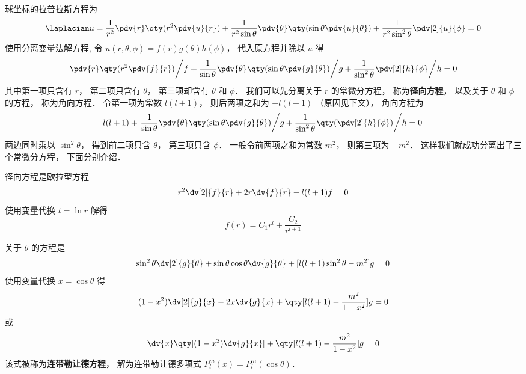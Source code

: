 

球坐标的拉普拉斯方程为
\begin{equation}
\laplacian u = \frac{1}{r^2} \pdv{r} \qty(r^2 \pdv{u}{r}) + \frac{1}{r^2 \sin\theta}\pdv{\theta} \qty(\sin \theta \pdv{u}{\theta}) + \frac{1}{r^2 \sin^2 \theta} \pdv[2]{u}{\phi} = 0
\end{equation}
使用分离变量法解方程, 令 $u(r, \theta, \phi) = f(r)g(\theta)h(\phi)$， 代入原方程并除以 $u$ 得
\begin{equation}
\left. \pdv{r} \qty(r^2 \pdv{f}{r}) \middle/ f + \frac{1}{\sin\theta}\pdv{\theta} \qty(\sin \theta \pdv{g}{\theta}) \middle/ g + \frac{1}{\sin^2 \theta} \pdv[2]{h}{\phi} \middle/ h = 0 \right.
\end{equation}
其中第一项只含有 $r$， 第二项只含有 $\theta$， 第三项却含有 $\theta$ 和 $\phi$． 我们可以先分离关于 $r$ 的常微分方程， 称为\textbf{径向方程}， 以及关于 $\theta$ 和 $\phi$ 的方程， 称为角向方程． 令第一项为常数 $l(l+1)$， 则后两项之和为 $-l(l+1)$ （原因见下文）， 角向方程为
\begin{equation}\label{SphLap_eq3}
l(l+1) + \left. \frac{1}{\sin\theta}\pdv{\theta} \qty(\sin \theta \pdv{g}{\theta}) \middle/ g + \frac{1}{\sin^2 \theta} \qty(\pdv[2]{h}{\phi}) \middle/ h = 0 \right.
\end{equation}
两边同时乘以 $\sin^2\theta$， 得到前二项只含 $\theta$， 第三项只含 $\phi$． 一般令前两项之和为常数 $m^2$， 则第三项为 $-m^2$． 这样我们就成功分离出了三个常微分方程， 下面分别介绍．

径向方程是欧拉型方程%
\begin{equation}
r^2\dv[2]{f}{r} + 2r\dv{f}{r} - l(l+1)f = 0
\end{equation}
使用变量代换 $t = \ln r$ 解得
\begin{equation}
f(r) = C_1 r^l + \frac{C_2}{r^{l+1}}
\end{equation}

关于 $\theta$ 的方程是
\begin{equation}
\sin^2\theta \dv[2]{g}{\theta} + \sin\theta\cos\theta\dv{g}{\theta} + [l(l+1)\sin^2\theta - m^2] g = 0
\end{equation}
使用变量代换 $x = \cos\theta$ 得
\begin{equation}
(1-x^2)\dv[2]{g}{x} - 2x\dv{g}{x} + \qty[l(l+1) - \frac{m^2}{1-x^2}]g = 0
\end{equation}
或
\begin{equation}
\dv{x} \qty[(1-x^2)\dv{g}{x}] + \qty[l(l+1) - \frac{m^2}{1-x^2}]g = 0
\end{equation}
该式被称为\textbf{连带勒让德方程}， 解为连带勒让德多项式 $P_l^m(x) = P_l^m(\cos\theta)$．

